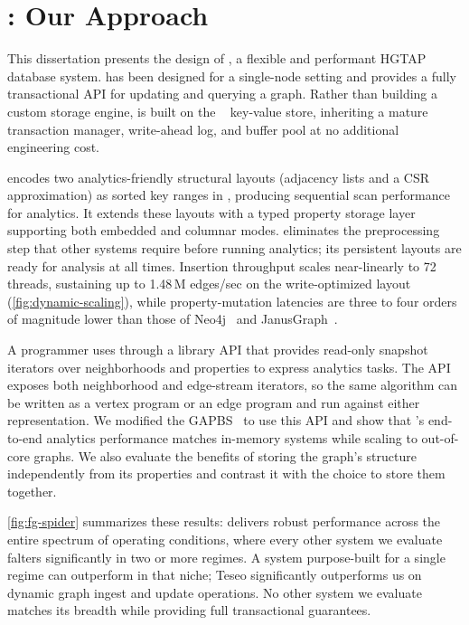 \section{\project{}: Our Approach}
\label{sec:intro:flexograph}

This dissertation presents the design of \project{}, a flexible and performant \ac{HGTAP} database system.
\project{} has been designed for a single-node setting and provides a fully transactional \ac{API} for updating and querying a graph.
Rather than building a custom storage engine, \project{} is built on the \wt{}~\cite{WiredTigerDocumentation} key-value store, inheriting a mature transaction manager, write-ahead log, and buffer pool at no additional engineering cost.

\project{} encodes two analytics-friendly structural layouts (adjacency lists and a CSR approximation) as sorted key ranges in \wt{}, producing sequential scan performance for analytics.
It extends these layouts with a typed property storage layer supporting both embedded and columnar modes.
\project{} eliminates the preprocessing step that other systems require before running analytics; its persistent layouts are ready for analysis at all times.
Insertion throughput scales near-linearly to 72 threads, sustaining up to 1.48\,M edges/sec on the write-optimized layout (\autoref{fig:dynamic-scaling}), while property-mutation latencies are three to four orders of magnitude lower than those of Neo4j~\cite{neo4j} and JanusGraph~\cite{janusgraph}.

A programmer uses \project{} through a library API that provides read-only snapshot iterators over neighborhoods and properties to express analytics tasks.
The API exposes both neighborhood and edge-stream iterators, so the same algorithm can be written as a vertex program or an edge program and run against either representation.
We modified the \ac{GAPBS}~\cite{beamer2015gap} to use this API and show that \project{}'s end-to-end analytics performance matches in-memory systems while scaling to out-of-core graphs.
We also evaluate the benefits of storing the graph's structure independently from its properties and contrast it with the choice to store them together.

\autoref{fig:fg-spider} summarizes these results: \project{} delivers robust performance across the entire spectrum of operating conditions, where every other system we evaluate falters significantly in two or more regimes.
A system purpose-built for a single regime can outperform \project{} in that niche; Teseo significantly outperforms us on dynamic graph ingest and update operations.
No other system we evaluate matches its breadth while providing full transactional guarantees.

